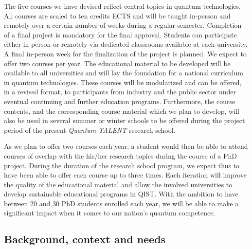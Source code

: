 \documentclass{scrreprt}
\begin{document}
The five courses we have devised reflect central topics in quantum
technologies. All courses are scaled to ten credits ECTS and will be
taught in-person and remotely over a certain number of weeks during a
regular semester. Completion of a final project is mandatory
for the final approval.  Students can participate either in person or
remotely via dedicated classrooms available at each university.  A
final in-person week for the finalization of the project is planned.
We expect to offer two courses per year. The educational material to
be developed will be available to all universities and will lay the
foundation for a national curriculum in quantum technologies. These
courses will be modularized and can be offered, in a revised format,
to participants from industry and the public sector under eventual
continuing and further education programs.
Furthermore, the course contents, and the corresponding course material which we plan to develop, will also be used in several summer or winter schools to be offered during the project period of the present \textit{Quantum-TALENT} research school.

As we plan to offer two courses each year, a student would then be able to attend courses of overlap with the his/her research topics during the course of a PhD project. 
During the duration of the research school program, we expect thus to have been able to offer each course up to three times. 
Each iteration will improve the quality of the educational material and allow the involved universities to develop sustainable educational programs in QIST. With the ambition to have between 20 and 30 PhD students enrolled each year, we will be able to make a significant impact when it comes to our nation's quantum competence.

\subsection{Background, context and needs}
\end{document}
